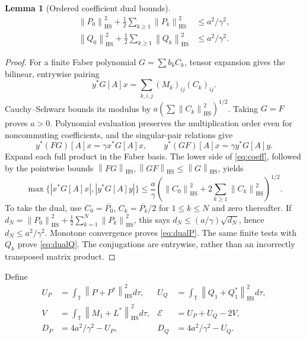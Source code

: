 \documentclass[11pt]{article}
\newtheorem{lemma}[theorem]{Lemma}
\theoremstyle{remark}\newtheorem{remark}[theorem]{Remark}
\newcommand{\HS}{\mathrm{HS}}
\newcommand{\T}{\mathbb T}
\newcommand{\norm}[1]{\left\lVert #1\right\rVert}
\begin{document}
\begin{lemma}[Ordered coefficient dual bounds]\label{lem:dual}
\begin{align}
\norm{P_0}_\HS^2+\frac12\sum_{k\ge1}\norm{P_k}_\HS^2&\le a^2/\gamma^2,\label{eq:dualP}\\
\norm{Q_0}_\HS^2+\frac12\sum_{k\ge1}\norm{Q_k}_\HS^2&\le a^2/\gamma^2.\label{eq:dualQ}
\end{align}
\end{lemma}
\begin{proof}
For a finite Faber polynomial $G=\sum b_k C_k$, tensor expansion gives the bilinear, entrywise pairing
\[y^*G[A]x=\sum_{k,i,j}(M_k)_{ij}(C_k)_{ij}.
\]
Cauchy--Schwarz bounds its modulus by $a(\sum\norm{C_k}_\HS^2)^{1/2}$. Taking $G=F$ proves $a>0$. Polynomial evaluation preserves the multiplication order even for noncommuting coefficients, and the singular-pair relations give
\[y^*(FG)[A]x=\gamma x^*G[A]x,\qquad
y^*(GF)[A]x=\gamma y^*G[A]y.
\]
Expand each full product in the Faber basis. The lower side of \eqref{eq:coeff}, followed by the pointwise bounds $\norm{FG}_\HS,\norm{GF}_\HS\le\norm G_\HS$, yields
\[\max\{|x^*G[A]x|,|y^*G[A]y|\}\le
\frac a\gamma\left(\norm{C_0}_\HS^2+2\sum_{k\ge1}\norm{C_k}_\HS^2\right)^{1/2}.
\]
To take the dual, use $C_0=\overline{P_0}$, $C_k=\overline{P_k}/2$ for $1\le k\le N$ and zero thereafter. If $d_N=\norm{P_0}_\HS^2+\frac12\sum_{k=1}^N\norm{P_k}_\HS^2$, this says $d_N\le(a/\gamma)\sqrt{d_N}$, hence $d_N\le a^2/\gamma^2$. Monotone convergence proves \eqref{eq:dualP}. The same finite tests with $Q_k$ prove \eqref{eq:dualQ}. The conjugations are entrywise, rather than an incorrectly transposed matrix product.
\end{proof}

Define
\begin{align*}
U_P&=\int_\T\norm{P+P^*}_\HS^2d\tau,&
U_Q&=\int_\T\norm{Q_1+Q_1^*}_\HS^2d\tau,\\
V&=\int_\T\norm{M_1+L^*}_\HS^2d\tau,&
\mathcal E&=U_P+U_Q-2V,\\
D_P&=4a^2/\gamma^2-U_P,&D_Q&=4a^2/\gamma^2-U_Q.
\end{align*}
\end{document}
